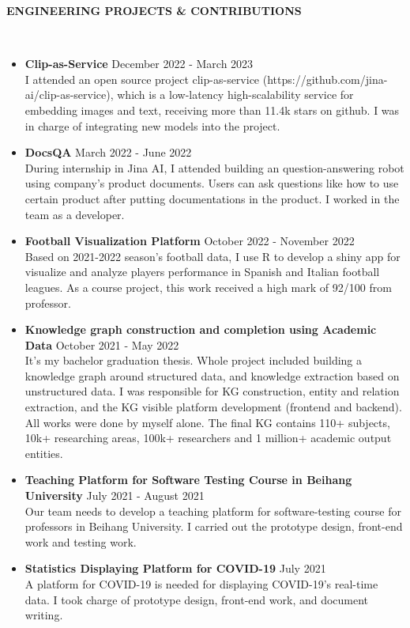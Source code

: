 \documentclass[10pt,article]{article}
\newcommand{\resheading}[1]{%
  {\small\colorbox{mygrey}{%
    \begin{minipage}{0.97\textwidth}\centering\textbf{#1 \vphantom{p\^{E}}}\end{minipage}%
  }}%
}
\begin{document}
\resheading{\textbf{ENGINEERING PROJECTS \& CONTRIBUTIONS}}\\
\begin{itemize}
\item \textbf{Clip-as-Service}  \hfill December 2022 - March 2023 \\
  I attended an open source project clip-as-service (https://github.com/jina-ai/clip-as-service), which is a low-latency high-scalability service for embedding images and text, receiving more than 11.4k stars on github. I was in charge of integrating new models into the project.

  \item \textbf{DocsQA}  \hfill March 2022 - June 2022 \\
  During internship in Jina AI, I attended building an question-answering robot using company’s product documents. Users can ask questions like how to use certain product after putting documentations in the product. I worked in the team as a developer.

   \item \textbf{Football Visualization Platform}
   \hfill October 2022 - November 2022 \\
  Based on 2021-2022 season's football data, I use R to develop a shiny app for visualize and analyze players performance in Spanish and Italian football leagues. As a course project, this work received a high mark of 92/100 from professor.

  \item \textbf{Knowledge graph construction and completion using Academic Data} \hfill October 2021 - May 2022 \\
  It's my bachelor graduation thesis. Whole project included building a knowledge graph around structured data, and knowledge extraction based on unstructured data. I was responsible for KG construction, entity and relation extraction, and the KG visible platform development (frontend and backend). All works were done by myself alone. The final KG contains 110+ subjects, 10k+ researching areas, 100k+ researchers and 1 million+ academic output entities.
  
  \item \textbf{Teaching Platform for Software Testing Course in Beihang University} \hfill July 2021 - August 2021 \\
  Our team needs to develop a teaching platform for software-testing course for professors in Beihang University. I carried out the prototype design, front-end work and testing work.

 \item \textbf{Statistics Displaying Platform for COVID-19} \hfill July 2021 \\
  A platform for COVID-19 is needed for displaying COVID-19's real-time data. I took charge of prototype design, front-end work, and document writing.
\end{itemize}
\end{document}
